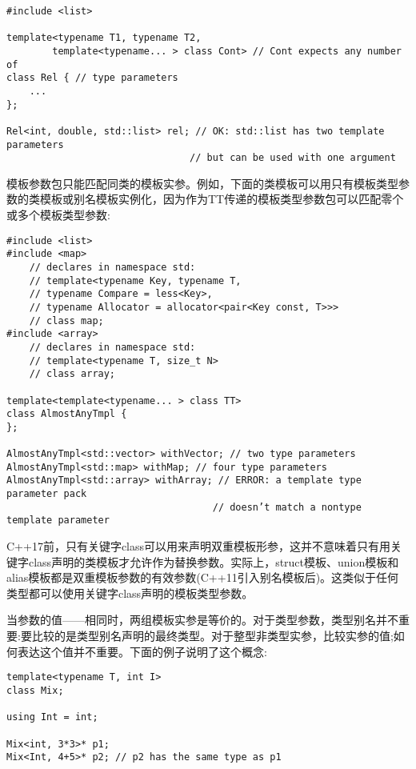 \begin{lstlisting}[style=styleCXX]
#include <list>

template<typename T1, typename T2,
		template<typename... > class Cont> // Cont expects any number of
class Rel { // type parameters
	...
};

Rel<int, double, std::list> rel; // OK: std::list has two template parameters
								// but can be used with one argument
\end{lstlisting}

模板参数包只能匹配同类的模板实参。例如，下面的类模板可以用只有模板类型参数的类模板或别名模板实例化，因为作为TT传递的模板类型参数包可以匹配零个或多个模板类型参数:

\begin{lstlisting}[style=styleCXX]
#include <list>
#include <map>
	// declares in namespace std:
	// template<typename Key, typename T,
	// typename Compare = less<Key>,
	// typename Allocator = allocator<pair<Key const, T>>>
	// class map;
#include <array>
	// declares in namespace std:
	// template<typename T, size_t N>
	// class array;
	
template<template<typename... > class TT>
class AlmostAnyTmpl {
};

AlmostAnyTmpl<std::vector> withVector; // two type parameters
AlmostAnyTmpl<std::map> withMap; // four type parameters
AlmostAnyTmpl<std::array> withArray; // ERROR: a template type parameter pack
									// doesn’t match a nontype template parameter
\end{lstlisting}

C++17前，只有关键字class可以用来声明双重模板形参，这并不意味着只有用关键字class声明的类模板才允许作为替换参数。实际上，struct模板、union模板和alias模板都是双重模板参数的有效参数(C++11引入别名模板后)。这类似于任何类型都可以使用关键字class声明的模板类型参数。


当参数的值——相同时，两组模板实参是等价的。对于类型参数，类型别名并不重要:要比较的是类型别名声明的最终类型。对于整型非类型实参，比较实参的值;如何表达这个值并不重要。下面的例子说明了这个概念:

\begin{lstlisting}[style=styleCXX]
template<typename T, int I>
class Mix;

using Int = int;

Mix<int, 3*3>* p1;
Mix<Int, 4+5>* p2; // p2 has the same type as p1
\end{lstlisting}

